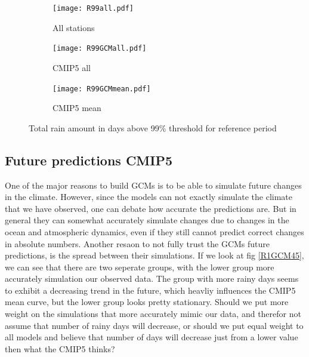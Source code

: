 \documentclass{article}
\begin{document}
\begin{figure}[H]
	\centering
	\begin{subfigure}{0.5\textwidth}
		\centering
		\texttt{[image: R99all.pdf]}
		\caption{All stations}
	\end{subfigure}%
	\begin{subfigure}{0.5\textwidth}
		\centering
		\texttt{[image: R99GCMall.pdf]}
		\caption{CMIP5 all}
	\end{subfigure}
	\begin{subfigure}{0.5\textwidth}
		\centering
		\texttt{[image: R99GCMmean.pdf]}
		\caption{CMIP5 mean}
	\end{subfigure}
	\caption{Total rain amount in days above 99\% threshold for reference period}
	\label{R99}
\end{figure}

\subsection{Future predictions CMIP5}
One of the major reasons to build GCMs is to be able to simulate future changes in the climate. However, since the models can not exactly simulate the climate that we have observed, one can debate how accurate the predictions are. But in general they can somewhat accurately simulate changes due to changes in the ocean and atmospheric dynamics, even if they still cannot predict correct changes in absolute numbers. Another resaon to not fully trust the GCMs future predictions, is the spread between their simulations. If we look at fig \ref{R1GCM45}, we can see that there are two seperate groups, with the lower group more accurately simulation our observed data. The group with more rainy days seems to exhibit a decreasing trend in the future, which heavliy influences the CMIP5 mean curve, but the lower group looks pretty stationary. Should we put more weight on the simulations that more accurately mimic our data, and therefor not assume that number of rainy days will decrease, or should we put equal weight to all models and believe that number of days will decrease just from a lower value then what the CMIP5 thinks?
\end{document}
